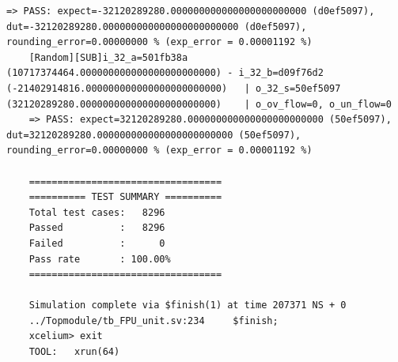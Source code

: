 \begin{lstlisting}[style=StyleResult, language=Result, basicstyle=\fontsize{5}{6}\selectfont\ttfamily,caption={Kết quả của Testbench.}]
	=> PASS: expect=-32120289280.000000000000000000000000 (d0ef5097), dut=-32120289280.000000000000000000000000 (d0ef5097), rounding_error=0.00000000 % (exp_error = 0.00001192 %)
	[Random][SUB]i_32_a=501fb38a (10717374464.000000000000000000000000) - i_32_b=d09f76d2 (-21402914816.000000000000000000000000) 	| o_32_s=50ef5097 (32120289280.000000000000000000000000) 	| o_ov_flow=0, o_un_flow=0
	=> PASS: expect=32120289280.000000000000000000000000 (50ef5097), dut=32120289280.000000000000000000000000 (50ef5097), rounding_error=0.00000000 % (exp_error = 0.00001192 %)
	
	==================================
	========== TEST SUMMARY ==========
	Total test cases:   8296
	Passed          :   8296
	Failed          :      0
	Pass rate       : 100.00%
	==================================
	
	Simulation complete via $finish(1) at time 207371 NS + 0
	../Topmodule/tb_FPU_unit.sv:234     $finish;
	xcelium> exit
	TOOL:	xrun(64)
\end{lstlisting}
